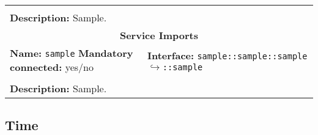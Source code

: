 \begin{center}
\begin{tabular}{|p{7.5cm}|p{7.5cm}|}
		\multicolumn{2}{|l|}{}\\
		\multicolumn{2}{|p{15cm}|}{\textbf{Description:} \newline Sample.}\\
		\hline
		\hline
		\multicolumn{2}{|c|}{\textbf{\large Service Imports}}\\
		\hline
		\multicolumn{1}{|p{7.5cm}}{\textbf{Name:} \texttt{sample} \newline \textbf{Mandatory connected:} yes/no} & \multicolumn{1}{p{7.5cm}|}{\textbf{Interface:} \newline \texttt{sample::sample::sample} \newline$\hookrightarrow$\texttt{::sample}}\\
		\multicolumn{2}{|l|}{}\\
		\multicolumn{2}{|p{15cm}|}{\textbf{Description:} \newline Sample.}\\
		\hline
	\end{tabular}
\end{center}

\subsection{Time}

